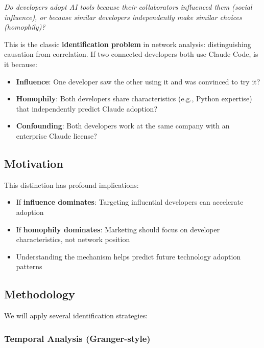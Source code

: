 \documentclass[11pt,letterpaper]{article}
\begin{document}
\begin{tcolorbox}[colback=green!5,colframe=green!75!black,title=Core Question]
\textit{Do developers adopt AI tools because their collaborators influenced them (social influence), or because similar developers independently make similar choices (homophily)?}
\end{tcolorbox}

This is the classic \textbf{identification problem} in network analysis: distinguishing causation from correlation. If two connected developers both use Claude Code, is it because:
\begin{itemize}
    \item \textbf{Influence}: One developer saw the other using it and was convinced to try it?
    \item \textbf{Homophily}: Both developers share characteristics (e.g., Python expertise) that independently predict Claude adoption?
    \item \textbf{Confounding}: Both developers work at the same company with an enterprise Claude license?
\end{itemize}

\subsection{Motivation}

This distinction has profound implications:
\begin{itemize}
    \item If \textbf{influence dominates}: Targeting influential developers can accelerate adoption
    \item If \textbf{homophily dominates}: Marketing should focus on developer characteristics, not network position
    \item Understanding the mechanism helps predict future technology adoption patterns
\end{itemize}

\subsection{Methodology}

We will apply several identification strategies:

\subsubsection{Temporal Analysis (Granger-style)}
\end{document}
